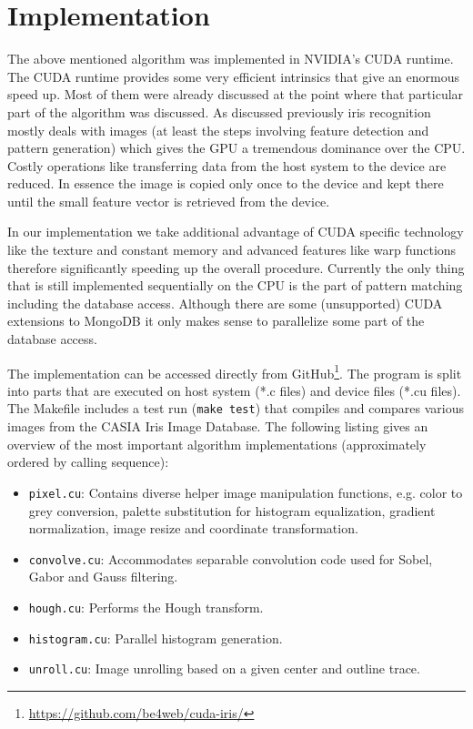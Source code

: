 \documentclass[journal]{IEEEtran}
\begin{document}
\section{Implementation}

The above mentioned algorithm was implemented in NVIDIA's CUDA runtime. The CUDA runtime provides some very efficient intrinsics that give an enormous speed up. Most of them were already discussed at the point where that particular part of the algorithm was discussed. As discussed previously iris recognition mostly deals with images (at least the steps involving feature detection and pattern generation) which gives the GPU a tremendous dominance over the CPU. Costly operations like transferring data from the host system to the device are reduced. In essence the image is copied only once to the device and kept there until the small feature vector is retrieved from the device.
\par In our implementation we take additional advantage of CUDA specific technology like the texture and constant memory and advanced features like warp functions therefore significantly speeding up the overall procedure. Currently the only thing that is still implemented sequentially on the CPU is the part of pattern matching including the database access. Although there are some (unsupported) CUDA extensions to MongoDB it only makes sense to parallelize some part of the database access.
\par The implementation can be accessed directly from GitHub\footnote{\url{https://github.com/be4web/cuda-iris/}}. The program is split into parts that are executed on host system (*.c files) and device files (*.cu files). The Makefile includes a test run (\verb+make test+) that compiles and compares various images from the CASIA Iris Image Database. The following listing gives an overview of the most important algorithm implementations (approximately ordered by calling sequence):
\begin{itemize}
	\item \verb+pixel.cu+: Contains diverse helper image manipulation functions, e.g. color to grey conversion, palette substitution for histogram equalization, gradient normalization, image resize and coordinate transformation.
	\item \verb+convolve.cu+: Accommodates separable convolution code used for Sobel, Gabor and Gauss filtering.
	\item \verb+hough.cu+: Performs the Hough transform.
	\item \verb+histogram.cu+: Parallel histogram generation. 
	\item \verb+unroll.cu+: Image unrolling based on a given center and outline trace.
\end{itemize}
\end{document}
